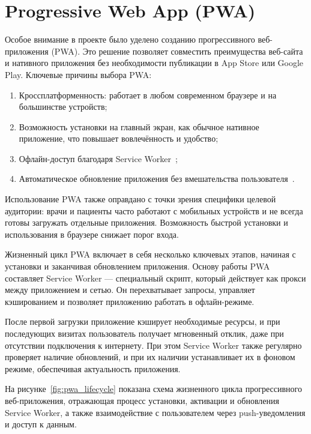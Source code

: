 \section{Progressive Web App (PWA)}\label{sec:---pwa}

Особое внимание в проекте было уделено созданию прогрессивного веб-приложения (PWA). Это решение позволяет совместить преимущества веб-сайта и нативного приложения без необходимости публикации в App Store или Google Play.
Ключевые причины выбора PWA:

\begin{enumerate}
    \item Кроссплатформенность: работает в любом современном браузере и на большинстве устройств;

    \item Возможность установки на главный экран, как обычное нативное приложение, что повышает вовлечённость и удобство;

    \item Офлайн-доступ благодаря Service Worker~\cite{google2025};

    \item Автоматическое обновление приложения без вмешательства пользователя~\cite{brainhub2025, mobiloud2025}.
\end{enumerate}


Использование PWA также оправдано с точки зрения специфики целевой аудитории: врачи и пациенты часто работают с мобильных устройств и не всегда готовы загружать отдельные приложения.
Возможность быстрой установки и использования в браузере снижает порог входа.

Жизненный цикл PWA включает в себя несколько ключевых этапов, начиная с установки и заканчивая обновлением приложения. Основу работы PWA составляет Service Worker — специальный скрипт, который действует как прокси между приложением и сетью. Он перехватывает запросы, управляет кэшированием и позволяет приложению работать в офлайн-режиме.

После первой загрузки приложение кэширует необходимые ресурсы, и при последующих визитах пользователь получает мгновенный отклик, даже при отсутствии подключения к интернету. При этом Service Worker также регулярно проверяет наличие обновлений, и при их наличии устанавливает их в фоновом режиме, обеспечивая актуальность приложения.

На рисунке~\ref{fig:pwa_lifecycle} показана схема жизненного цикла прогрессивного веб-приложения, отражающая процесс установки, активации и обновления Service Worker, а также взаимодействие с пользователем через push-уведомления и доступ к данным.

